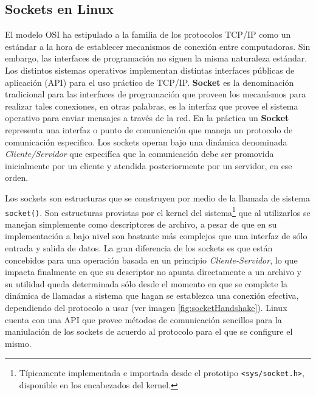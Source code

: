 \subsection{Sockets en Linux}
El modelo OSI ha estipulado a la familia de los protocolos TCP/IP como un estándar a la hora de establecer mecanismos de conexión entre computadoras. Sin embargo, las interfaces de programación no siguen la misma naturaleza estándar. Los distintos sistemas operativos implementan distintas interfaces públicas de aplicación (API) para el uso práctico de TCP/IP. \textbf{Socket} es la denominación tradicional para las interfaces de programación que proveen los mecanísmos para realizar tales conexiones, en otras palabras, es la interfaz que provee el sistema operativo para enviar mensajes a través de la red. En la práctica un \textbf{Socket} representa una interfaz o punto de comunicación que maneja un protocolo de comunicación especifico. Los sockets operan bajo una dinámica denominada \emph{Cliente/Servidor} que especifíca que la comunicación debe ser promovida inicialmente por un cliente y atendida posteriormente por un servidor, en ese orden.

Los sockets \cite{rfc:147, book:sockets} son estructuras que se construyen por medio de la llamada de sistema \verb=socket()=. Son estructuras provistas por el kernel del sistema\footnote{Típicamente implementada e importada desde el prototipo \verb=<sys/socket.h>=, disponible en los encabezados del kernel.} que al utilizarlos se manejan simplemente como descriptores de archivo, a pesar de que en su implementación a bajo nivel son bastante más complejos que una interfaz de sólo entrada y salida de datos. La gran diferencia de los sockets es que están concebidos para una operación basada en un principio \emph{Cliente-Servidor}, lo que impacta finalmente en que su descriptor no apunta directamente a un archivo y su utilidad queda determinada sólo desde el momento en que se complete la dinámica de llamadas a sistema que hagan se establezca una conexión efectiva, dependiendo del protocolo a usar (ver imagen \ref{fig:socketHandshake}). Linux cuenta con una API que provee métodos de comunicación sencillos para la maniulación de los sockets de acuerdo al protocolo para el que se configure el mismo.

